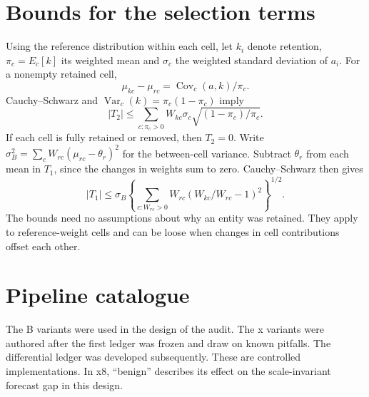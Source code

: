 \documentclass[linenumber]{jdsart}
\newcommand{\datatable}[1]{{\small\setlength{\tabcolsep}{4pt}\resizebox{\ifdim\width>\linewidth\linewidth\else\width\fi}{!}{}}}
\begin{document}
\begin{appendix}
\section{Bounds for the selection terms}\label{app:bounds}
Using the reference distribution within each cell, let \(k_i\) denote retention, \(\pi_c=E_c[k]\) its weighted mean and \(\sigma_c\) the weighted standard deviation of \(a_i\). For a nonempty retained cell,
\[
\mu_{kc}-\mu_{rc}=\operatorname{Cov}_c(a,k)/\pi_c.
\]
Cauchy--Schwarz and \(\operatorname{Var}_c(k)=\pi_c(1-\pi_c)\) imply
\[
 |T_2|\le \sum_{c:\pi_c>0}W_{kc}\sigma_c\sqrt{(1-\pi_c)/\pi_c}.
\]
If each cell is fully retained or removed, then \(T_2=0\). Write \(\sigma_B^2=\sum_c W_{rc}(\mu_{rc}-\theta_r)^2\) for the between-cell variance. Subtract \(\theta_r\) from each mean in \(T_1\), since the changes in weights sum to zero. Cauchy--Schwarz then gives
\[
 |T_1|\le \sigma_B\left\{\sum_{c:W_{rc}>0}W_{rc}(W_{kc}/W_{rc}-1)^2\right\}^{1/2}.
\]
The bounds need no assumptions about why an entity was retained. They apply to reference-weight cells and can be loose when changes in cell contributions offset each other.

\section{Pipeline catalogue}\label{app:catalogue}
The B variants were used in the design of the audit. The x variants were authored after the first ledger was frozen and draw on known pitfalls. The differential ledger was developed subsequently. These are controlled implementations. In x8, ``benign'' describes its effect on the scale-invariant forecast gap in this design.
\begin{center}\datatable{tab_catalogue}\end{center}
\end{appendix}


\end{document}
